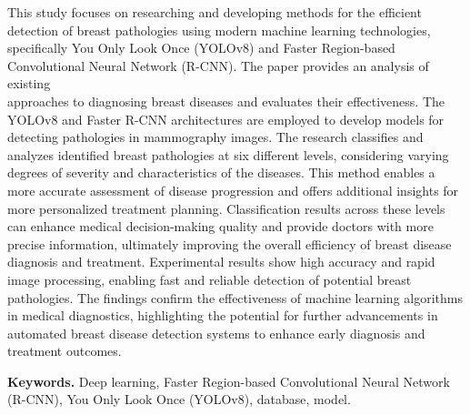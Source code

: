 This study focuses on researching and developing methods for the
efficient detection of breast pathologies using modern machine learning
technologies, specifically You Only Look Once (YOLOv8) and Faster
Region-based Convolutional Neural Network (R-CNN). The paper provides an
analysis of existing \\approaches to diagnosing breast diseases and
evaluates their effectiveness. The YOLOv8 and Faster R-CNN architectures
are employed to develop models for detecting pathologies in mammography
images. The research classifies and analyzes identified breast
pathologies at six different levels, considering varying degrees of
severity and characteristics of the diseases. This method enables a more
accurate assessment of disease progression and offers additional
insights for more personalized treatment planning. Classification
results across these levels can enhance medical decision-making quality
and provide doctors with more precise information, ultimately improving
the overall efficiency of breast disease diagnosis and treatment.
Experimental results show high accuracy and rapid image processing,
enabling fast and reliable detection of potential breast pathologies.
The findings confirm the effectiveness of machine learning algorithms in
medical diagnostics, highlighting the potential for further advancements
in automated breast disease detection systems to enhance early diagnosis
and treatment outcomes.

{\bfseries Keywords.} Deep learning, Faster Region-based Convolutional
Neural Network (R-CNN), You Only Look Once (YOLOv8), database, model.

